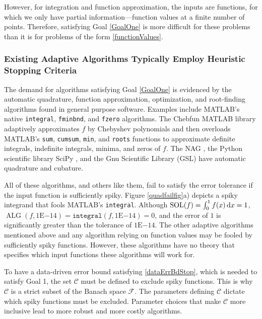 \documentclass[11pt]{NSFamsart}
\DeclareMathOperator{\SOL}{SOL}
\DeclareMathOperator{\ALG}{ALG}
\def\dif{\textup{d}}
\newcommand{\calc}{{\mathcal{C}}}
\newcommand{\calf}{{\mathcal{F}}}
\begin{document}
However, for integration and function approximation, the inputs are functions, for which we only have partial information---function values at a finite number of points.  Therefore, satisfying Goal \ref{GoalOne} is more difficult for these problems than it is for problems of the form \eqref{functionValues}.  

\subsubsection*{Existing Adaptive Algorithms Typically Employ Heuristic Stopping Criteria}
The demand for algorithms satisfying Goal \ref{GoalOne} is evidenced by the automatic quadrature, function approximation, optimization, and root-finding algorithms found in general purpose software.  Examples include MATLAB's \cite{MAT9.3} native \texttt{integral}, \texttt{fminbnd}, and \texttt{fzero} algorithms.  The Chebfun \cite{TrefEtal17a} MATLAB library adaptively approximates $f$ by Chebyshev polynomials and then overloads MATLAB's \texttt{sum}, \texttt{cumsum}, \texttt{min}, and \texttt{roots} functions to approximate definite integrals, indefinite integrals, minima, and zeros of $f$.  The  NAG \citep{NAG23}, the Python scientific library SciPy \cite{SCIPY}, and the Gnu Scientific Library (GSL) \cite{GSL} have automatic quadrature and cubature. 

All of these algorithms, and others like them, fail to satisfy the error tolerance if the input function is sufficiently spiky.  Figure \ref{quadfailfig}a) depicts a spiky integrand that fools MATLAB's \texttt{integral}.  Although $\SOL(f) = \int_0^1 f(x) \, \dif x = 1$, $\ALG(f,1\text{E}{-14}) = \texttt{integral}(f,1\text{E}{-14}) = 0$, and the error of $1$ is significantly greater than the tolerance of $1\text{E}{-14}$.  The other adaptive algorithms mentioned above and any algorithm relying on function values may be fooled by sufficiently spiky functions.  However, these algorithms have no theory that specifies which input functions these algorithms will work for.

To have a data-driven error bound satisfying \eqref{dataErrBdStop}, which is needed to satisfy Goal 1, the set $\calc$ must be defined to exclude spiky functions.  This is why $\calc$ is a strict subset of the Banach space $\calf$.  The parameters defining $\calc$ dictate which spiky functions must be excluded.  Parameter choices that make $\calc$ more inclusive lead to more robust and more costly algorithms.
\end{document}
